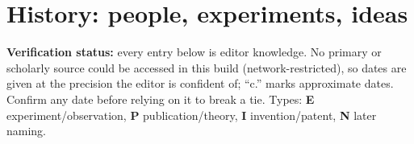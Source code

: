 \section{History: people, experiments, ideas}\label{sec:history}
\begin{trapbox}\textbf{Verification status:} every entry below is editor knowledge. No primary or scholarly source could be accessed in this build (network-restricted), so dates are given at the precision the editor is confident of; ``c.'' marks approximate dates. Confirm any date before relying on it to break a tie. Types: \textbf{E} experiment/observation, \textbf{P} publication/theory, \textbf{I} invention/patent, \textbf{N} later naming.\end{trapbox}

